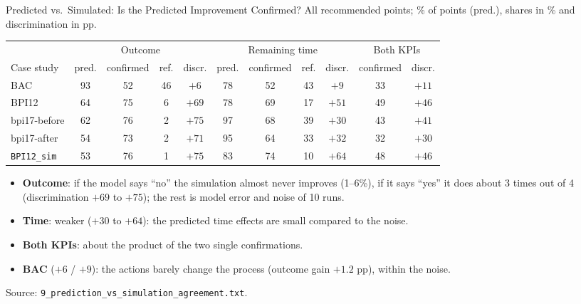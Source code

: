 \documentclass[aspectratio=169]{beamer} %
\begin{document}
\begin{frame}{Predicted vs.\ Simulated: Is the Predicted Improvement Confirmed?}
  \footnotesize
  All recommended points; \% of points (pred.), shares in \% and discrimination in pp.
  \begin{center}\scriptsize\setlength{\tabcolsep}{3.5pt}
  \begin{tabular}{l cccc cccc cc}
    \toprule
     & \multicolumn{4}{c}{Outcome} & \multicolumn{4}{c}{Remaining time} & \multicolumn{2}{c}{Both KPIs} \\
    \cmidrule(lr){2-5}\cmidrule(lr){6-9}\cmidrule(lr){10-11}
    Case study & pred. & confirmed & ref. & discr. & pred. & confirmed & ref. & discr. & confirmed & discr. \\
    \midrule
    BAC                 & 93 & 52 & 46 & $+6$  & 78 & 52 & 43 & $+9$  & 33 & $+11$ \\
    BPI12               & 64 & 75 &  6 & $+69$ & 78 & 69 & 17 & $+51$ & 49 & $+46$ \\
    bpi17-before        & 62 & 76 &  2 & $+75$ & 97 & 68 & 39 & $+30$ & 43 & $+41$ \\
    bpi17-after         & 54 & 73 &  2 & $+71$ & 95 & 64 & 33 & $+32$ & 32 & $+30$ \\
    \texttt{BPI12\_sim} & 53 & 76 &  1 & $+75$ & 83 & 74 & 10 & $+64$ & 48 & $+46$ \\
    \bottomrule
  \end{tabular}
  \end{center}
  \scriptsize
  \begin{itemize}
    \item \textbf{Outcome}: if the model says ``no'' the simulation almost never improves (1--6\%), if it says
      ``yes'' it does about 3 times out of 4 (discrimination $+69$ to $+75$); the rest is model error and noise of 10 runs.
    \item \textbf{Time}: weaker ($+30$ to $+64$): the predicted time effects are small compared to the noise.
    \item \textbf{Both KPIs}: about the product of the two single confirmations.
    \item \textbf{BAC} ($+6$ / $+9$): the actions barely change the process (outcome gain $+1.2$ pp), within the noise.
  \end{itemize}
  {\scriptsize Source: \texttt{9\_prediction\_vs\_simulation\_agreement.txt}.}
\end{frame}
\end{document}
